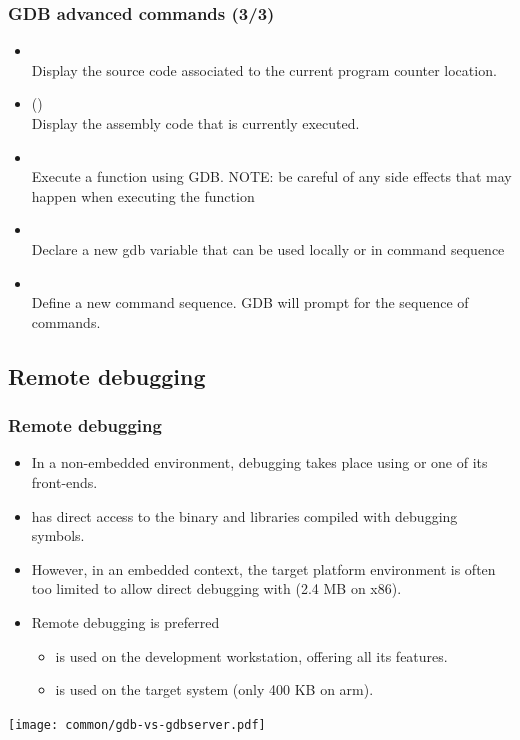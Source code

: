 {\begin{frame}
  \frametitle{GDB advanced commands (3/3)}
  \small
  \begin{itemize}
    \item {}\\
      Display the source code associated to the current program counter location.
    \item {} ()\\
      Display the assembly code that is currently executed.
    \item {}\\
      Execute a function using GDB. NOTE: be careful of any side effects that
      may happen when executing the function
    \item {}\\
      Declare a new gdb variable that can be used locally or in command sequence
    \item {}\\
      Define a new command sequence. GDB will prompt for the sequence of
      commands.
  \end{itemize}
\end{frame}
}
{
\subsection{Remote debugging}
}

\begin{frame}
  \frametitle{Remote debugging}
  \begin{itemize}
  \item In a non-embedded environment, debugging takes place using 
    or one of its front-ends.
  \item {} has direct access to the binary and libraries compiled
    with debugging symbols.
  \item However, in an embedded context, the target platform
    environment is often too limited to allow direct debugging with
     (2.4 MB on x86).
  \item Remote debugging is preferred
    \begin{itemize}
    \item {} is used on the development workstation, offering
      all its features.
    \item {} is used on the target system (only 400 KB
      on arm).
    \end{itemize}
  \end{itemize}
  \begin{center}
    \texttt{[image: common/gdb-vs-gdbserver.pdf]}
  \end{center}
\end{frame}

